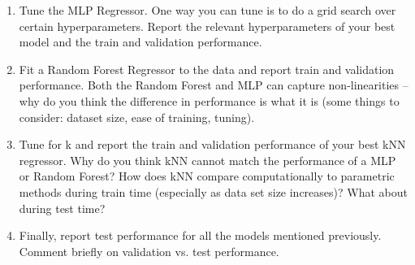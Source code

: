 \documentclass[submit]{harvardml}
\begin{document}
\begin{problem}
\begin{enumerate}
  \item Tune the MLP Regressor. One way you can tune is to do a grid search over certain hyperparameters. Report the relevant hyperparameters of your best model and the train and validation performance.

  \item Fit a Random Forest Regressor to the data and report train and validation performance. Both the Random Forest and MLP can capture non-linearities -- why do you think the difference in performance is what it is (some things to consider: dataset size, ease of training, tuning). 

  \item Tune for k and report the train and validation performance of your best kNN regressor. Why do you think kNN cannot match the performance of a MLP or Random Forest? How does kNN compare computationally to parametric methods during train time (especially as data set size increases)? What about during test time?
  
  \item Finally, report test performance for all the models mentioned previously. Comment briefly on validation vs. test performance.

\end{enumerate}

\end{problem}
\newpage
\end{document}
